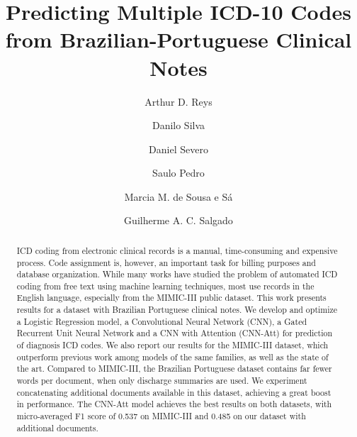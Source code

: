 \documentclass[runningheads]{llncs}
\def\FINAL{}
\begin{document}
\title{Predicting Multiple ICD-10 Codes from Brazilian-Portuguese Clinical Notes}


\ifdefined\FINAL
	\author{Arthur D. Reys \and
	Danilo Silva \and
	Daniel Severo \and
	Saulo Pedro\and
	Marcia M. de Sousa e Sá\and
	Guilherme A. C. Salgado}
\fi



\maketitle


\begin{abstract}
ICD coding from electronic clinical records is a manual, time-consuming and expensive process. Code assignment is, however, an important task for billing purposes and database organization. While many works have studied the problem of automated ICD coding from free text using machine learning techniques, most use records in the English language, especially from the MIMIC-III public dataset. This work presents results for a dataset with Brazilian Portuguese clinical notes. We develop and optimize a Logistic Regression model, a Convolutional Neural Network (CNN), a Gated Recurrent Unit Neural Network and a CNN with Attention (CNN-Att) for prediction of diagnosis ICD codes. We also report our results for the MIMIC-III dataset, which outperform previous work among models of the same families, as well as the state of the art. Compared to MIMIC-III, the Brazilian Portuguese dataset contains far fewer words per document, when only discharge summaries are used. We experiment concatenating additional documents available in this dataset, achieving a great boost in performance. The CNN-Att model achieves the best results on both datasets, with micro-averaged F1 score of 0.537 on MIMIC-III and 0.485 on our dataset with additional documents.
	
	
\end{abstract}
\end{document}
